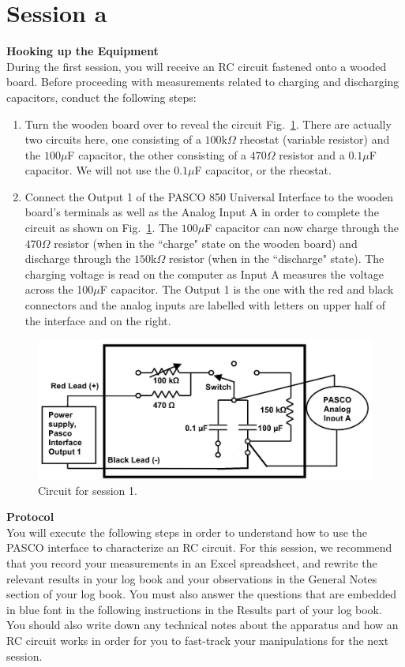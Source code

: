 \documentclass[12pt]{report}
\begin{document}
\section{Session a}
\noindent \large \textbf{Hooking up the Equipment} \normalsize \\
During the first session, you will receive an RC circuit fastened onto a wooded board. 
Before proceeding with measurements related to charging and discharging capacitors, conduct the following steps:
\begin{enumerate}
\item Turn the wooden board over to reveal the circuit Fig.~\ref{Fig:lab2-session1-circuit1}. 
There are actually two circuits here, one consisting of a $100$k$\Omega$ rheostat (variable resistor) and the $100\mu$F capacitor, the other consisting of a $470\Omega$ resistor and a $0.1\mu$F capacitor. 
We will not use the $0.1 \mu$F capacitor, or the rheostat.
\item Connect the Output 1 of the PASCO 850 Universal Interface to the wooden board's terminals as well as the Analog Input A in order to complete the circuit as shown on Fig.~\ref{Fig:lab2-session1-circuit1}. 
The $100\mu$F capacitor can now charge through the $470\Omega$ resistor (when in the ``charge" state on the wooden board) and discharge through the $150$k$\Omega$ resistor (when in the ``discharge" state). 
The charging voltage is read on the computer as Input A measures the voltage across the 100$\mu$F capacitor. 
The Output 1 is the one with the red and black connectors and the analog inputs are labelled with letters on upper half of the interface and on the right.
\end{enumerate}

\begin{figure}[h]
\centering
\includegraphics[width=0.75\linewidth]{lab2-session1-circuit2}
\caption{Circuit for session 1.}
\label{Fig:lab2-session1-circuit1}
\end{figure}


\noindent \large \textbf{Protocol} \normalsize \\
You will execute the following steps in order to understand how to use the PASCO interface to characterize an RC circuit. 
For this session, we recommend that you {\color{blue} record your measurements in an Excel spreadsheet, and rewrite the relevant results in your log book and your observations in the General Notes section of your log book. You must also answer the questions that are embedded in blue font in the following instructions in the Results part of your log book. You should also write down any technical notes about the apparatus and how an RC circuit works in order for you to fast-track your manipulations for the next session.}
\end{document}
